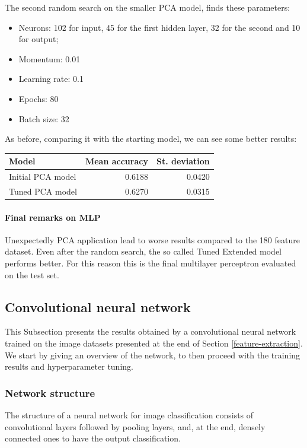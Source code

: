 The second random search on the smaller PCA model, finds these parameters:
\begin{itemize}
    \item Neurons: 102 for input, 45 for the first hidden layer, 32 for the second and 10 for output;
    \item Momentum: 0.01
    \item Learning rate: 0.1
    \item Epochs: 80
    \item Batch size: 32
\end{itemize}
As before, comparing it with the starting model, we can see some better results:
\begin{center}
    \begin{tabular}{ |l|r|r| } 
        \hline
        Model & Mean accuracy & St. deviation \\
        \hline
        Initial PCA model & 0.6188 & 0.0420\\
        Tuned PCA model & 0.6270 & 0.0315\\
        \hline
    \end{tabular}
\end{center}

\paragraph{Final remarks on MLP}
Unexpectedly PCA application lead to worse results compared to the 180
feature dataset. Even after the random search, the so called Tuned Extended model
performs better. For this reason this is the final multilayer perceptron
evaluated on the test set.

\subsection{Convolutional neural network}
This Subsection presents the results obtained by a convolutional
neural network trained on the image datasets presented at the end of 
Section \vref*{feature-extraction}.
We start by giving an overview of the network, to then proceed 
with the training results and hyperparameter tuning.

\subsubsection{Network structure}
The structure of a neural network for image classification 
consists of convolutional layers followed by pooling layers, 
and, at the end, densely connected ones to have the output classification.

